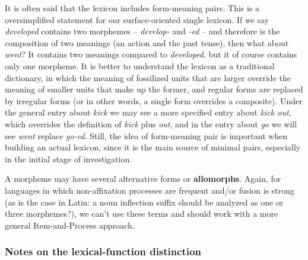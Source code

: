 \documentclass[UTF8, a4paper, oneside, scheme=plain]{ctexart}
\newcommand*{\concept}[1]{\textbf{#1}}
\newcommand*{\corpus}[1]{\emph{#1}}
\begin{document}
It is often said that the lexicon includes form-meaning pairs.
This is a oversimplified statement
for our surface-oriented single lexicon.
If we say \corpus{developed} contains two morphemes -- 
\corpus{develop-} and \corpus{-ed} --
and therefore is the composition of two meanings 
(an action and the past tense),
then what about \corpus{went}?
It contains two meanings compared to \corpus{developed},
but it of course contains only one morpheme.
It is better to understand the lexicon as a traditional dictionary,
in which the meaning of fossilized units that are larger 
override the meaning of smaller units that make up the former,
and regular forms are replaced by irregular forms
(or in other words,
a single form overrides a composite).
Under the general entry about \corpus{kick}
we may see a more specified entry about \corpus{kick out},
which overrides the definition of \corpus{kick} plus \corpus{out},
and in the entry about \corpus{go} we will see \corpus{went} replace \corpus{go-ed}.
Still, the idea of form-meaning pair is important when building an actual lexicon,
since it is the main source of minimal pairs,
especially in the initial stage of investigation.

A morpheme may have several alternative forms or \concept{allomorphs}. 
Again, for languages in which non-affixation processes are frequent and/or fusion is strong 
(as is the case in Latin: a noun inflection suffix should be analyzed as one or three morphemes?), 
we can't use these terms and should work with a more general Item-and-Process approach.

\subsubsection{Notes on the lexical-function distinction}\label{sec:lexical-function-distinction}
\end{document}
